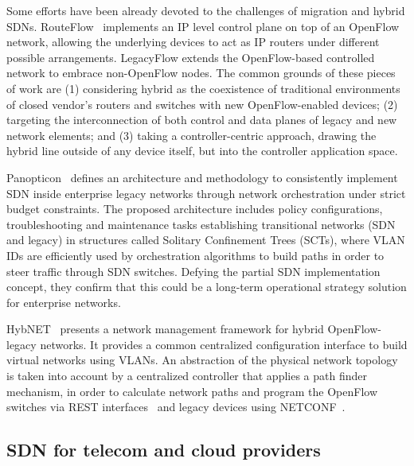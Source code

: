 Some efforts have been already devoted to the challenges of migration and hybrid SDNs. RouteFlow~\cite{rothenberg2012-1} implements an IP level control plane on top of an OpenFlow 
network, allowing the underlying devices to act as IP routers under different possible arrangements. LegacyFlow 
\cite{rothenberg2014} extends the OpenFlow-based controlled network to embrace non-OpenFlow nodes. The common 
grounds of these pieces of work are (1) considering hybrid as the coexistence of traditional environments of 
closed vendor's routers and switches with new OpenFlow-enabled devices; (2) targeting the interconnection of 
both control and data planes of legacy and new network elements; and (3) taking a controller-centric approach, 
drawing the hybrid line outside of any device itself, but into the controller application space.

Panopticon~\cite{levin2014} defines an architecture and methodology to consistently implement 
SDN inside enterprise legacy networks through network orchestration under strict budget constraints. The proposed 
architecture includes policy configurations, troubleshooting and maintenance tasks establishing transitional networks 
(SDN and legacy) in structures called Solitary Confinement Trees (SCTs), where VLAN IDs are efficiently used by 
orchestration algorithms to build paths in order to steer traffic through SDN switches. Defying the partial SDN 
implementation concept, they confirm that this could be a long-term operational strategy solution for enterprise 
networks.

HybNET~\cite{lu2013} presents a network management framework for
hybrid OpenFlow-legacy networks. It provides a common centralized
configuration interface to build virtual networks using VLANs. An
abstraction of the physical network topology is taken into account by
a centralized controller that applies a path finder mechanism, in
order to calculate network paths and program the OpenFlow switches via
REST interfaces~\cite{richardson2008restful} and legacy devices using NETCONF~\cite{enns2011-1}.

\subsection{SDN for telecom and cloud providers}

